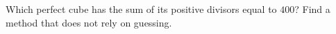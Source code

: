 Which perfect cube has the sum of its positive divisors equal to $400$? Find a method that does not rely on guessing.
